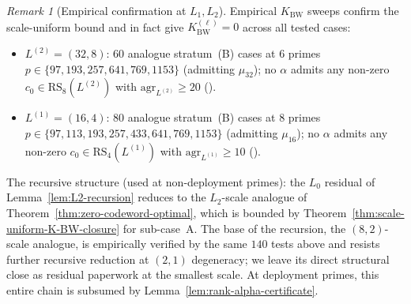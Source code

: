 \documentclass[11pt]{article}
\theoremstyle{definition}
\theoremstyle{remark}
\newtheorem{remark}[theorem]{Remark}
\begin{document}
\begin{remark}[Empirical confirmation at $L_1, L_2$]
\label{rem:scale-uniform-empirical}
Empirical $K_{\mathrm{BW}}$ sweeps confirm the scale-uniform bound and
in fact give $K_{\mathrm{BW}}^{(\ell)} = 0$ across all tested cases:
\begin{itemize}[leftmargin=2em]
\item $L^{(2)} = (32, 8)$: $60$ analogue stratum~(B) cases at $6$ primes
  $p \in \{97, 193, 257, 641, 769, 1153\}$ (admitting $\mu_{32}$);
  no $\alpha$ admits any non-zero $c_0 \in \mathrm{RS}_8(L^{(2)})$ with
  $\mathrm{agr}_{L^{(2)}} \geq 20$ (\cite{CompanionRepo}).
\item $L^{(1)} = (16, 4)$: $80$ analogue stratum~(B) cases at $8$ primes
  $p \in \{97, 113, 193, 257, 433, 641, 769, 1153\}$ (admitting $\mu_{16}$);
  no $\alpha$ admits any non-zero $c_0 \in \mathrm{RS}_4(L^{(1)})$ with
  $\mathrm{agr}_{L^{(1)}} \geq 10$ (\cite{CompanionRepo}).
\end{itemize}
The recursive structure (used at non-deployment primes): the $L_0$
residual of Lemma~\ref{lem:L2-recursion} reduces to the $L_2$-scale
analogue of Theorem~\ref{thm:zero-codeword-optimal}, which is bounded
by Theorem~\ref{thm:scale-uniform-K-BW-closure} for sub-case~A. The
base of the recursion, the $(8, 2)$-scale analogue, is empirically
verified by the same $140$ tests above and resists further recursive
reduction at $(2, 1)$ degeneracy; we leave its direct structural close
as residual paperwork at the smallest scale. At deployment primes,
this entire chain is subsumed by Lemma~\ref{lem:rank-alpha-certificate}.
\end{remark}
\end{document}
